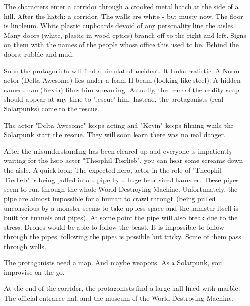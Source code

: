 The characters enter a corridor through a crooked metal hatch at the side of a hill. After the hatch: a corridor. The walls are white - but musty now. The floor is linoleum.
White plastic cupboards devoid of any personality line the aisles. Many doors (white, plastic in wood optics) branch off to the right and left. Signs on them with the names of the people whose office this used to be. Behind the doors: rubble and mud.


Soon the protagonists will find a simulated accident. It looks realistic: A Norm actor (Delta Awesome) lies under a foam H-beam (looking like steel). A hidden cameraman (Kevin) films him screaming. Actually, the hero of the reality soap should appear at any time to 'rescue' him. Instead, the protagonists (real Solarpunks) come to the rescue.

The actor "Delta Awesome" keeps acting and "Kevin" keeps filming while the Solarpunk start the rescue. They will soon learn there was no real danger.

After the misunderstanding has been cleared up and everyone is impatiently waiting for the hero actor  "Theophil Tierlieb", you can hear some screams down the aisle. A quick look: The expected hero, actor in the role of "Theophil Tierlieb" is being pulled into a pipe by a huge bear sized hamster. These pipes seem to run through the whole World Destroying Machine.
Unfortunately, the pipe are almost impossible for a human to crawl through (being pulled unconscious by a monster seems to take up less space and the hamster itself is built for tunnels and pipes). At some point the pipe will also break due to the stress. Drones would be able to follow the beast. It is impossible to follow through the pipes. following the pipes is possible but tricky. Some of them pass through walls.

The protagonists need a map. And maybe weapons. As a Solarpunk, you improvise on the go.

At the end of the corridor, the protagonists find a large hall lined with marble. The official entrance hall and the museum of the World Destroying Machine.

